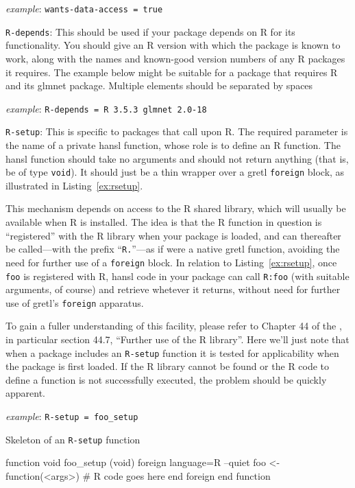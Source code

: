 \documentclass[oneside]{book}
\newcommand{\ttusage}[1]{\textit{example}: \quad \texttt{#1}}
\begin{document}
\begin{description}
  \ttusage{wants-data-access = true}

\item \texttt{R-depends}: This should be used if your package depends
  on \textsf{R} for its functionality. You should give an \textsf{R}
  version with which the package is known to work, along with the
  names and known-good version numbers of any \textsf{R} packages it
  requires. The example below might be suitable for a package that
  requires \textsf{R} and its \textsf{glmnet} package. Multiple
  elements should be separated by spaces

  \ttusage{R-depends = R 3.5.3 glmnet 2.0-18}

\item \texttt{R-setup}: This is specific to packages that call upon
  \textsf{R}. The required parameter is the name of a private hansl
  function, whose role is to define an \textsf{R} function. The hansl
  function should take no arguments and should not return anything
  (that is, be of type \texttt{void}). It should just be a thin
  wrapper over a gretl \texttt{foreign} block, as illustrated in
  Listing~\ref{ex:rsetup}.

  This mechanism depends on access to the \textsf{R} shared library,
  which will usually be available when \textsf{R} is installed. The
  idea is that the \textsf{R} function in question is ``registered''
  with the \textsf{R} library when your package is loaded, and can
  thereafter be called---with the prefix ``\texttt{R.}''---as if were
  a native gretl function, avoiding the need for further use of a
  \texttt{foreign} block. In relation to Listing~\ref{ex:rsetup}, once
  \texttt{foo} is registered with \textsf{R}, hansl code in your
  package can call \texttt{R:foo} (with suitable arguments, of course)
  and retrieve whetever it returns, without need for further use of
  gretl's \texttt{foreign} apparatus.

  To gain a fuller understanding of this facility, please refer to
  Chapter 44 of the \GUG, in particular section 44.7, ``Further use of
  the R library''. Here we'll just note that when a package includes
  an \texttt{R-setup} function it is tested for applicability when the
  package is first loaded. If the \textsf{R} library cannot be found
  or the \textsf{R} code to define a function is not successfully
  executed, the problem should be quickly apparent.

  \ttusage{R-setup = foo\_setup}

\begin{script}[htbp]
  \caption{Skeleton of an \texttt{R-setup} function}
  \label{ex:rsetup}
\begin{code}
   function void foo_setup (void)
      foreign language=R --quiet
      foo <- function(<args>) {
         # R code goes here
      }
      end foreign
   end function
\end{code}
\end{script}


\end{description}
\end{document}
